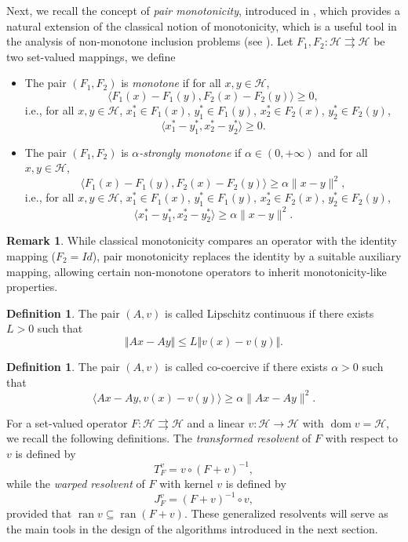 \documentclass[11pt]{article}
\theoremstyle{definition}
\newtheorem{definition}[theorem]{Definition}
\theoremstyle{definition}
\theoremstyle{definition}
\newtheorem{remark}[theorem]{Remark}
\newcommand{\ran}{\ensuremath{\operatorname{ran}}}
\newcommand{\dom}{\ensuremath{\operatorname{dom}}}
\def\beq{\begin{equation}}
\def\eeq{\end{equation}}
\begin{document}
	Next, we  recall the concept of \emph{pair monotonicity}, introduced in \cite{acl}, which provides a natural extension of the classical notion of monotonicity, which is a useful tool in the analysis of non-monotone inclusion problems (see \cite{LDT,LMT}). Let \( F_1, F_2 : \mathcal{H} \rightrightarrows \mathcal{H} \) be two set-valued mappings, we define 

\begin{itemize}
\item
The pair \( (F_1, F_2) \) is \emph{monotone} if for all \( x, y \in \mathcal{H} \),
$$
\langle F_1(x) - F_1(y), F_2(x) - F_2(y) \rangle \geq 0,
$$
i.e., for all \( x, y \in \mathcal{H} \), \( x_1^* \in F_1(x) \), \( y_1^* \in F_1(y) \), \( x_2^* \in F_2(x) \), \( y_2^* \in F_2(y) \),
$$
\langle x_1^* - y_1^*, x_2^* - y_2^* \rangle \geq 0.
$$
\item
The pair \( (F_1, F_2) \) is \emph{\(\alpha\)-strongly monotone} if \( \alpha \in (0, +\infty) \) and for all \( x, y \in \mathcal{H} \),
$$
\langle F_1(x) - F_1(y), F_2(x) - F_2(y) \rangle \geq \alpha \|x - y\|^2,
$$
i.e., for all \( x, y \in \mathcal{H} \), \( x_1^* \in F_1(x) \), \( y_1^* \in F_1(y) \), \( x_2^* \in F_2(x) \), \( y_2^* \in F_2(y) \),
$$
\langle x_1^* - y_1^*, x_2^* - y_2^* \rangle \geq \alpha \|x - y\|^2.
$$
\end{itemize}  

\begin{remark}
While classical monotonicity compares an operator with the identity mapping ($F_2=Id$), pair monotonicity replaces the identity by a suitable auxiliary mapping, allowing certain non-monotone operators to inherit monotonicity-like properties.   	
\end{remark}  

\begin{definition}
The pair $(A,v)$ is called Lipschitz continuous if there exists $L>0$ such that 
$$
\Vert Ax-Ay\Vert\le L \Vert v(x)-v(y)\Vert.
$$
\end{definition}

\begin{definition}
The pair $(A,v)$ is called co-coercive  if there exists $\alpha>0$ such that 
$$
\langle Ax-Ay, v(x) - v(y) \rangle \geq \alpha \|Ax - Ay\|^2.
$$
\end{definition}

For a set-valued operator \( F : \mathcal{H} \rightrightarrows \mathcal{H} \) and a linear $v: \mathcal{H} \to \mathcal{H}$ with \( \dom v = \mathcal{H} \), we recall the following definitions. The \emph{transformed resolvent} of $F$ with respect to $v$ \cite{LDT} is defined by     
\[
T_{F}^v = v \circ (F + v)^{-1},
\] 
while the \emph{warped resolvent} of $F$ with kernel $v$ \cite{bc} is defined by
\[
J_F^v = (F + v)^{-1} \circ v,
\] 
provided that \( \ran v \subseteq \ran(F + v) \). These generalized resolvents will serve as the main tools in the design of the algorithms introduced in the next section. 
\end{document}
